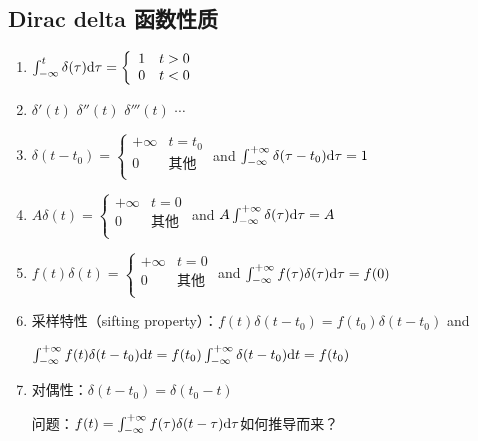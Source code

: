 \documentclass[UTF8]{ctexart}
\begin{document}
\subsection{Dirac delta 函数性质}
\begin{enumerate}[align=left,label=(\arabic*)]
    \item $\int_{-\infty}^{t}{\delta(\tau)\rm{d}\tau}=\left\{
           \begin{array}{cl}
           1 &t>0 \\
           0 &t<0 \\
           \end{array} \right.$
    \item ${\delta}'(t)$ \quad ${\delta}''(t)$ \quad ${\delta}'''(t)$ \quad $\cdots$
    \item $\delta(t-t_0)=\left\{
          \begin{array}{cl}
          +\infty &t=t_0 \\
          0 &\mbox{其他} \\
          \end{array} \right.$ \quad and \quad
          $\int_{-\infty}^{+\infty}{\delta(\tau-t_0)\rm{d}\tau}=1$
    \item $A\delta(t)=\left\{
          \begin{array}{cl}
          +\infty &t=0 \\
          0 &\mbox{其他} \\
          \end{array} \right.$ \quad and \quad
          $A\int_{-\infty}^{+\infty}{\delta(\tau)\rm{d}\tau}=A$
    \item $f(t)\delta(t)=\left\{
          \begin{array}{cl}
          +\infty &t=0 \\
          0 &\mbox{其他} \\
          \end{array} \right.$ \quad and \quad
          $\int_{-\infty}^{+\infty}{f(\tau)\delta(\tau)\rm{d}\tau}=f(0)$
    \item 采样特性（sifting property）：$f(t)\delta(t-t_0)=f(t_0)\delta(t-t_0)$ \quad and \par
          $\int_{-\infty}^{+\infty}{f(t)\delta(t-t_0){\rm{d}}t}=f(t_0)\int_{-\infty}^{+\infty}{\delta(t-t_0){\rm{d}}t}=f(t_0)$
    \item 对偶性：$\delta(t-t_0)=\delta(t_0-t)$ \par
          问题：$f(t)=\int_{-\infty}^{+\infty}{f(\tau)\delta(t-\tau)\rm{d}\tau}$如何推导而来？\par

\end{enumerate}
\end{document}
